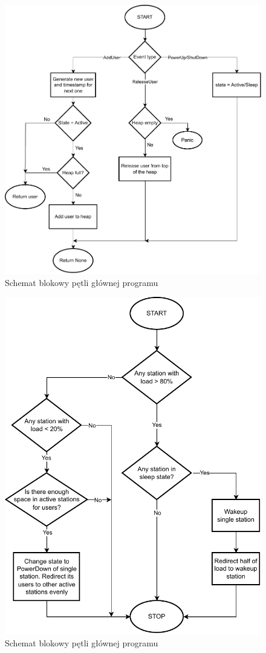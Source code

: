 \begin{figure}
\center
\includegraphics[scale=0.8]{img/station_event.pdf} 
\caption{Schemat blokowy pętli głównej programu}
\label{station_event}
\end{figure}


\begin{figure}
\center
\includegraphics[scale=0.8]{img/power_up_down_logic.pdf} 
\caption{Schemat blokowy pętli głównej programu}
\label{power_up_down}
\end{figure}